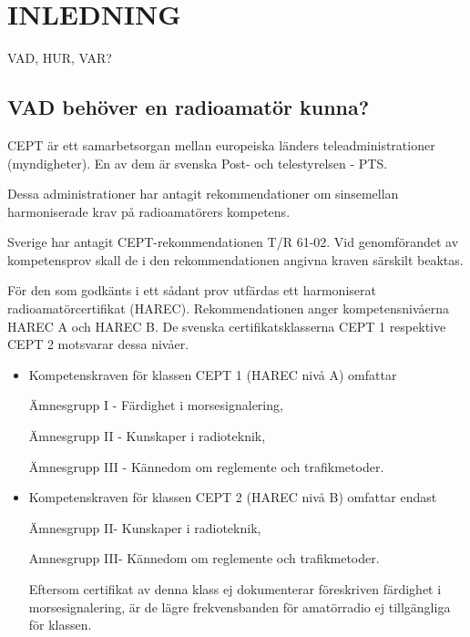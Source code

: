 \chapter*{INLEDNING}

\Huge{VAD, HUR, VAR?}\normalsize

\section*{VAD behöver en radioamatör kunna?}

CEPT är ett samarbetsorgan mellan europeiska länders teleadministrationer (myndigheter). En av dem är svenska Post- och telestyrelsen - PTS.

Dessa administrationer har antagit rekommendationer om sinsemellan harmoniserade krav på radioamatörers kompetens.


Sverige har antagit CEPT-rekommendationen T/R 61-02. Vid genomförandet av
kompetensprov skall de i den rekommendationen angivna kraven särskilt beaktas.

\begin{rev-omarbetas}

För den som godkänts i ett sådant prov utfärdas ett harmoniserat radioamatörcertifikat
(HAREC). Rekommendationen anger kompetensnivåerna HAREC A och HAREC B. De svenska
certifikatsklasserna CEPT 1 respektive CEPT 2 motsvarar dessa nivåer.

\begin{itemize}
\item Kompetenskraven för klassen CEPT 1
(HAREC nivå A) omfattar

Ämnesgrupp I - Färdighet i morsesignalering,

Ämnesgrupp II - Kunskaper i radioteknik,

Ämnesgrupp III - Kännedom om reglemente och trafikmetoder.

\item Kompetenskraven för klassen CEPT 2
(HAREC nivå B) omfattar endast

Ämnesgrupp II- Kunskaper i radioteknik,

Amnesgrupp III- Kännedom om reglemente och trafikmetoder.

Eftersom certifikat av denna klass ej dokumenterar föreskriven färdighet i
morsesignalering, är de lägre frekvensbanden för amatörradio ej tillgängliga för klassen.
\end{itemize}

\end{rev-omarbetas}

